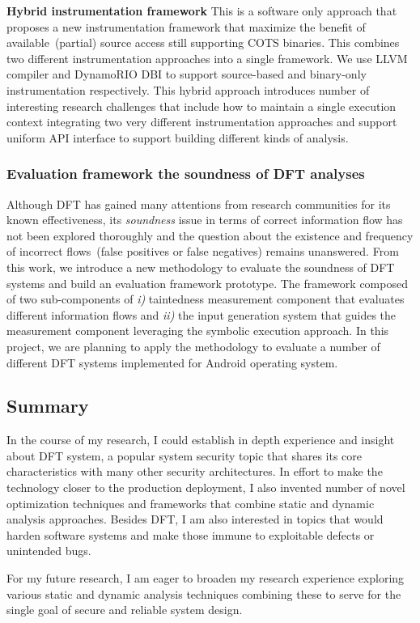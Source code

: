 \documentclass[letterpaper, 10pt]{article}
\begin{document}
\begin{small}
{\bf Hybrid instrumentation framework} This is a software only approach that
proposes a new instrumentation framework that maximize the benefit of
available~(partial) source access still supporting COTS binaries.
%
This combines two different instrumentation approaches into a single framework.
We use LLVM compiler and DynamoRIO DBI to support source-based and binary-only
instrumentation respectively.
%
This hybrid approach introduces number of interesting research challenges that
include how to maintain a single execution context integrating two very different
instrumentation approaches and support uniform API interface to support
building different kinds of analysis.
%

\subsubsection*{Evaluation framework the soundness of DFT analyses}
%
Although DFT has gained many attentions from research communities for its known
effectiveness, its {\it soundness} issue in terms of correct information flow
has not been explored thoroughly and the question about the existence and
frequency of incorrect flows~(false positives or false negatives) remains
unanswered. From this work, we introduce a new methodology to evaluate the
soundness of DFT systems and build an evaluation framework prototype. 
%
The framework composed of two sub-components of {\it i)} taintedness
measurement component that evaluates different information flows and {\it ii)}
the input generation system that guides the measurement component leveraging
the symbolic execution approach.
%
In this project, we are planning to apply the methodology to evaluate a number
of different DFT systems implemented for Android operating system.

\subsection*{Summary} 
%
In the course of my research, I could establish in depth experience and insight
about DFT system, a popular system security topic that shares its core
characteristics with many other security architectures.
%
In effort to make the technology closer to the production deployment, I also
invented number of novel optimization techniques and frameworks that combine
static and dynamic analysis approaches.
%
Besides DFT, I am also interested in topics that would harden software systems
and make those immune to exploitable defects or unintended bugs. 

For my future research, I am eager to broaden my research experience
exploring various static and dynamic analysis techniques combining these to
serve for the single goal of secure and reliable system design.

\end{small} 




\end{document}
